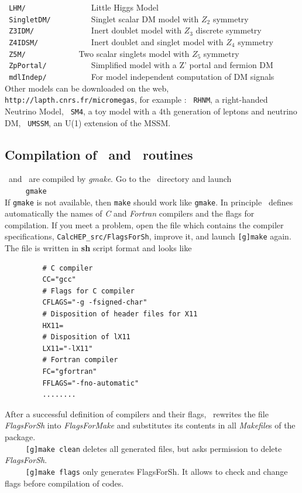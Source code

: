 \documentclass[12pt,a4paper]{article}
\begin{document}
\verb| LHM/               |         Little Higgs Model\cite{Belyaev:2006jh} \\
\verb| SingletDM/         | Singlet scalar DM model with $Z_2$ symmetry \cite{McDonald:2001vt} \\ 
\verb| Z3IDM/             |        Inert doublet model  with $Z_3$ discrete
symmetry \cite{Belanger:2012vp,Belanger:2014bga} \\
\verb| Z4IDSM/            |         Inert doublet and singlet model with $Z_4$
symmetry \cite{Belanger:2012vp,Belanger:2014bga} \\  
\verb| Z5M/            |       Two scalar singlets model with $Z_5$
symmetry \cite{Belanger:2020hyh} \\  
\verb| ZpPortal/          | Simplified model with a Z' portal  and fermion DM  \\ 
\verb| mdlIndep/          |           For model independent computation of DM signals                                 \\

Other models can be downloaded on the  web,  \verb|http://lapth.cnrs.fr/micromegas|, for example :
\verb| RHNM|, a right-handed Neutrino Model\cite{Belanger:2007dx},          
\verb| SM4|, a toy model with a 4th generation of leptons and neutrino DM, 
\verb| UMSSM|, an   U(1) extension of the MSSM\cite{DaSilva:2013jga,Belanger:2015cra}.


\subsection{Compilation of \calchep\ and \micro\ routines}
   \calchep\ and \micro\ are compiled by {\it gmake}. Go to the \micro\ directory
and launch\\
\verb|     gmake|\\
If {\tt gmake} is not available, then {\tt make} should work like {\tt gmake}.
In principle \micro\ defines automatically the names of {\it C} and {\it
Fortran} compilers and the flags for
compilation. If you meet a  problem, open the file which contains the compiler specifications, 
\verb|CalcHEP_src/FlagsForSh|,
 improve it, and launch {\tt [g]make} 
again. The file  is written in {\bf sh} script format and looks like
\begin{verbatim}
         # C compiler
         CC="gcc"
         # Flags for C compiler
         CFLAGS="-g -fsigned-char"
         # Disposition of header files for X11
         HX11=
         # Disposition of lX11
         LX11="-lX11"
         # Fortran compiler
         FC="gfortran"
         FFLAGS="-fno-automatic"
         ........
\end{verbatim}
After a successful definition of compilers and their flags,   \micro\ rewrites the file 
 {\it FlagsForSh} into {\it FlagsForMake} and substitutes its contents in all {\it
Makefile}s of the package.\\
\verb|     [g]make clean|    deletes all generated files, but asks permission to
delete {\it FlagsForSh}.\\
\verb|     [g]make flags|       only generates FlagsForSh. It allows to check and
change  flags before compilation of codes.
\end{document}
